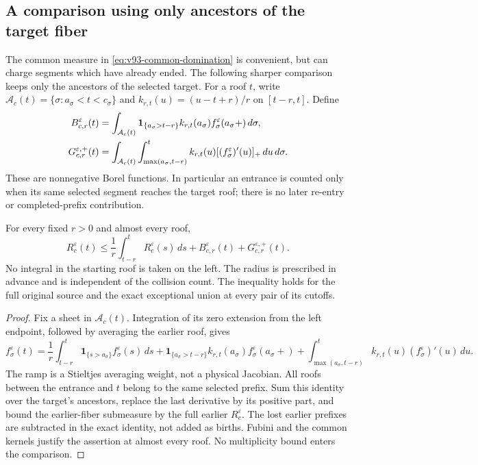 \subsection{A comparison using only ancestors of the target fiber}
The common measure in \eqref{eq:v93-common-domination} is convenient,
but can charge segments which have already ended. The following
sharper comparison keeps only the ancestors of the selected target.
For a roof $t$, write
$\mathcal A_c(t)=\{\sigma:a_\sigma<t<c_\sigma\}$ and
$k_{r,t}(u)=(u-t+r)/r$ on $[t-r,t]$. Define
\begin{align}
 B_{c,r}^\varepsilon(t)
  &=\int_{\mathcal A_c(t)}\mathbf1_{\{a_\sigma>t-r\}}
       k_{r,t}(a_\sigma)f_\sigma^\varepsilon(a_\sigma+)\,d\sigma,
                                                        \notag\\
 G_{c,r}^{\varepsilon,+}(t)
  &=\int_{\mathcal A_c(t)}\int_{\max(a_\sigma,t-r)}^t
       k_{r,t}(u)[(f_\sigma^\varepsilon)'(u)]_+\,du\,d\sigma.
                                                        \label{eq:v93-ancestral-budget}
\end{align}
These are nonnegative Borel functions. In particular an entrance
is counted only when its same selected segment reaches the target
roof; there is no later re-entry or completed-prefix contribution.

\begin{theorem}
\label{thm:v93-pointwise}
For every fixed $r>0$ and almost every roof,
\begin{equation}\label{eq:v93-pointwise}
 R_c^\varepsilon(t)\le
 \frac1r\int_{t-r}^t R_c^\varepsilon(s)\,ds
                      +B_{c,r}^\varepsilon(t)+G_{c,r}^{\varepsilon,+}(t).
\end{equation}
No integral in the starting roof is taken on the left.
The radius is prescribed in advance and is independent of the
collision count. The inequality holds for the full original source
and the exact exceptional union at every pair of its cutoffs.
\end{theorem}
\begin{proof}
Fix a sheet in $\mathcal A_c(t)$. Integration of its zero extension
from the left endpoint, followed by averaging the earlier roof, gives
\[
 f_\sigma^\varepsilon(t)
 =\frac1r\int_{t-r}^t\mathbf1_{\{s>a_\sigma\}}
                                      f_\sigma^\varepsilon(s)\,ds
 +\mathbf1_{\{a_\sigma>t-r\}}k_{r,t}(a_\sigma)
                                      f_\sigma^\varepsilon(a_\sigma+)
 +\int_{\max(a_\sigma,t-r)}^t k_{r,t}(u)
                                      (f_\sigma^\varepsilon)'(u)\,du.
\]
The ramp is a Stieltjes averaging weight, not a physical Jacobian.
All roofs between the entrance and $t$ belong to the same selected
prefix. Sum this identity over the target's ancestors, replace the
last derivative by its positive part, and bound the earlier-fiber
submeasure by the full earlier $R_c^\varepsilon$. The lost earlier
prefixes are subtracted in the exact identity, not added as births.
Fubini and the common kernels justify the assertion at almost every
roof. No multiplicity bound enters the comparison.
\end{proof}

